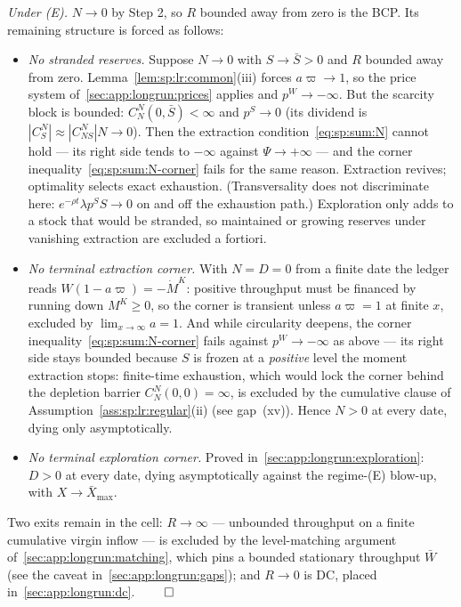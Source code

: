 \emph{Under (E).} $N\to0$ by Step 2, so $R$ bounded away from zero is the BCP. Its remaining
structure is forced as follows:
\begin{itemize}
    \item \emph{No stranded reserves.} Suppose $N\to0$ with $S\to\bar S>0$ and $R$ bounded away
    from zero. Lemma~\ref{lem:sp:lr:common}(iii) forces $a\varpi\to1$, so the price system
    of~\ref{sec:app:longrun:prices} applies and $p^W\to-\infty$. But the scarcity block is
    bounded: $C^N_N\left(0,\bar S\right)<\infty$ and $p^S\to0$ (its dividend is
    $\left|C^N_S\right|\approx\left|C^N_{NS}\right|N\to0$). Then the extraction
    condition~\eqref{eq:sp:sum:N} cannot hold --- its right side tends to $-\infty$ against
    $\Psi\to+\infty$ --- and the corner inequality~\eqref{eq:sp:sum:N-corner} fails for the
    same reason. Extraction revives; optimality selects exact exhaustion. (Transversality does
    not discriminate here: $e^{-\rho t}\lambda p^SS\to0$ on and off the exhaustion path.)
    Exploration only adds to a stock that would be stranded, so maintained or growing reserves
    under vanishing extraction are excluded a fortiori.
    \item \emph{No terminal extraction corner.} With $N=D=0$ from a finite date the ledger
    reads $W\left(1-a\varpi\right)=-\dot M^K$: positive throughput must be financed by running
    down $M^K\ge0$, so the corner is transient unless $a\varpi=1$ at finite $x$, excluded by
    $\lim_{x\to\infty}a=1$. And while circularity deepens, the corner
    inequality~\eqref{eq:sp:sum:N-corner} fails against $p^W\to-\infty$ as above --- its
    right side stays bounded because $S$ is frozen at a \emph{positive} level the moment
    extraction stops: finite-time exhaustion, which would lock the corner behind the
    depletion barrier $C^N_N\left(0,0\right)=\infty$, is excluded by the cumulative clause
    of Assumption~\ref{ass:sp:lr:regular}(ii) (see gap~(xv)). Hence $N>0$
    at every date, dying only asymptotically.
    \item \emph{No terminal exploration corner.} Proved
    in~\ref{sec:app:longrun:exploration}: $D>0$ at every date, dying asymptotically against the
    regime-(E) blow-up, with $X\to\bar X_{\max}$.
\end{itemize}
Two exits remain in the cell: $R\to\infty$ --- unbounded throughput on a finite cumulative
virgin inflow --- is excluded by the level-matching argument of~\ref{sec:app:longrun:matching},
which pins a bounded stationary throughput $\bar W$ (see the caveat
in~\ref{sec:app:longrun:gaps}); and $R\to0$ is DC, placed in~\ref{sec:app:longrun:dc}.
\hfill$\qed$

